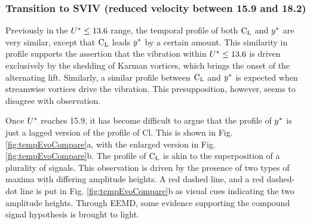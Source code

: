 \documentclass[oneside]{utmthesis}
\begin{document}
\subsubsection{Transition to SVIV (reduced velocity between 15.9 and 18.2)} \label{sssec:transSVIV}

Previously in the $U^{*} \leq 13.6$ range, the temporal profile of both $\text{C}_{\text{L}}$ and  $y^{*}$ are very similar, except that $\text{C}_{\text{L}}$ leads $y^{*}$ by a certain amount. This similarity in profile supports the assertion that the vibration within $U^{*} \leq 13.6$ is driven exclusively by the shedding of Karman vortices, which brings the onset of the alternating lift. Similarly, a similar profile between $\text{C}_{\text{L}}$ and $y^{*}$ is expected when streamwise vortices drive the vibration. This presupposition, however, seems to disagree with observation.

Once $U^{*}$ reaches 15.9, it has become difficult to argue that the profile of $y^{*}$ is just a lagged version of the profile of Cl. This is shown in Fig. \ref{fig:tempEvoCompare}a, with the enlarged version in Fig. \ref{fig:tempEvoCompare}b. The profile of $\text{C}_{\text{L}}$ is akin to the superposition of a plurality of signals. This observation is driven by the presence of two types of maxima with differing amplitude heights. A red dashed line, and a red dashed-dot line is put in Fig. \ref{fig:tempEvoCompare}b as visual cues indicating the two amplitude heights. Through EEMD, some evidence supporting the compound signal hypothesis is brought to light.
\end{document}
